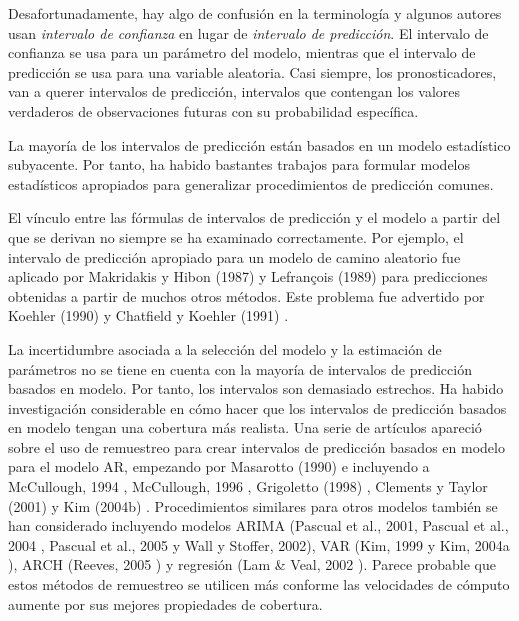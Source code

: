 \documentclass{llncs}
\begin{document}
Desafortunadamente, hay algo de confusión en la terminología y algunos autores usan \emph{intervalo de confianza} en lugar de \emph{ intervalo de predicción}. El intervalo de confianza se usa para un parámetro del modelo, mientras que el intervalo de predicción se usa para una variable aleatoria. Casi siempre, los pronosticadores, van a querer intervalos de predicción, intervalos que contengan los valores verdaderos de observaciones futuras con su probabilidad específica.

La mayoría de los intervalos de predicción están basados en un modelo estadístico subyacente. Por tanto, ha habido bastantes trabajos para formular modelos estadísticos apropiados para generalizar procedimientos de predicción comunes.

El vínculo entre las fórmulas de intervalos de predicción y el modelo a partir del que se derivan no siempre se ha examinado correctamente. Por ejemplo, el intervalo de predicción apropiado para un modelo de camino aleatorio fue aplicado por Makridakis y Hibon (1987) \cite{Makridakis1987489} y Lefrançois (1989) \cite{Lefrancois1989553} para predicciones obtenidas a partir de muchos otros métodos. Este problema fue advertido por Koehler (1990) \cite{Koehler1990557} y Chatfield y Koehler (1991) \cite{Chatfield1991239}.

La incertidumbre asociada a la selección del modelo y la estimación de parámetros no se tiene en cuenta con la mayoría de intervalos de predicción basados en modelo. Por tanto, los intervalos son demasiado estrechos. Ha habido investigación considerable en cómo hacer que los intervalos de predicción basados en modelo tengan una cobertura más realista. Una serie de artículos apareció sobre el uso de remuestreo para crear intervalos de predicción basados en modelo para el modelo AR, empezando por Masarotto (1990) \cite{Masarotto1990229} e incluyendo a McCullough, 1994 \cite{McCullough199451}, McCullough, 1996 \cite{Mccullough1996293}, Grigoletto (1998) \cite{Grigoletto1998447}, Clements y Taylor (2001) \cite{Clements2001247} y Kim (2004b) \cite{Kim200485}. Procedimientos similares para otros modelos también se han considerado incluyendo modelos ARIMA (Pascual et al., 2001\cite{Pascual200183}, Pascual et al., 2004 \cite{Pascual2004449}, Pascual et al., 2005 \cite{Pascual2005219} y Wall y Stoffer, 2002\cite{Wall2002733}), VAR (Kim, 1999 \cite{Kim1999393} y Kim, 2004a \cite{Kim200485}), ARCH (Reeves, 2005 \cite{Reeves2005237}) y regresión (Lam \& Veal, 2002 \cite{Lam2002125}). Parece probable que estos métodos de remuestreo se utilicen más conforme las velocidades de cómputo aumente por sus mejores propiedades de cobertura.
\end{document}
